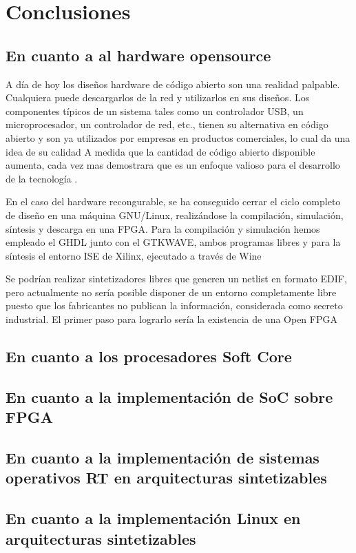  \chapter{Conclusiones}

	\section{En cuanto a al hardware opensource} 
A día de hoy los diseños hardware de código abierto son una realidad palpable. Cualquiera puede descargarlos de la red y utilizarlos en sus diseños. Los componentes típicos de un sistema tales como un controlador USB, un microprocesador, un controlador de red, etc., tienen su alternativa en código abierto y son ya utilizados por empresas en productos comerciales, lo cual da una idea de su calidad
A medida que la cantidad de código abierto disponible aumenta, cada vez mas demostrara que es un enfoque valioso para el desarrollo de la tecnología .

En el caso del hardware recongurable, se ha conseguido cerrar el ciclo completo de diseño en una máquina GNU/Linux, realizándose la compilación, simulación, síntesis y descarga en una FPGA. Para la compilación y simulación hemos empleado el GHDL junto con el GTKWAVE, ambos programas libres y para la síntesis el entorno ISE de Xilinx, ejecutado a través de Wine

Se podrían realizar sintetizadores libres que generen un netlist en formato EDIF, pero actualmente no sería posible disponer de un entorno completamente libre puesto que los fabricantes no publican la información, considerada como secreto industrial. El primer paso para lograrlo sería la existencia de una Open FPGA
	\section{En cuanto a los procesadores Soft Core} 
	
	
	\section{En cuanto a la implementación de SoC sobre FPGA} 
		
		
	\section{En cuanto a la implementación de sistemas operativos RT en arquitecturas sintetizables} 
		
	
	\section{En cuanto a la implementación Linux en arquitecturas sintetizables} 
		

